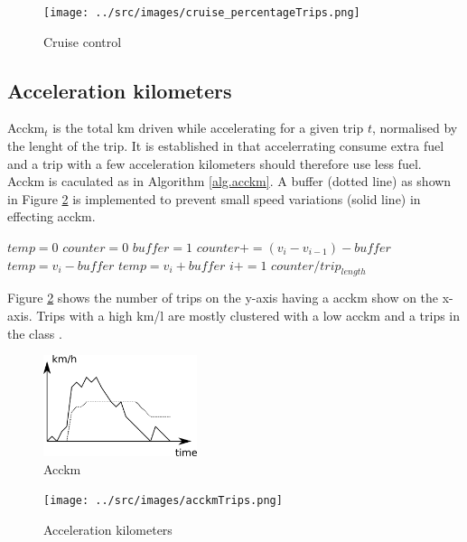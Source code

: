 \begin{figure}
\centering
\texttt{[image: ../src/images/cruise\_percentageTrips.png]}
\caption{Cruise control}
\label{fig:cruiseTrips}
\end{figure}

\subsection{Acceleration kilometers}
Acckm$_t$ is the total km driven while accelerating for a given trip $t$, normalised by the lenght of the trip. 
It is established in \cite{EcoMark} that accelerrating consume extra fuel and a trip with a few acceleration kilometers should therefore use less fuel.  
Acckm is caculated as in Algorithm \ref{alg.acckm}. 
A buffer (dotted line) as shown in Figure \ref{fig:acckm} is implemented to prevent small speed variations (solid line) in effecting acckm.

\begin{algorithm}
\caption{$acckm$}\label{alg.acckm}
\begin{algorithmic}[1]
\State $temp = 0$
\State $counter = 0$
\State $buffer = 1$ %
	\State $counter += (v_i - v_{i-1}) - buffer$
	\State $temp = v_i - buffer$
	\State $temp = v_i + buffer$
\EndIf
\State $i+=1$
\EndWhile
\State \Return $ counter / trip_{length}$

\end{algorithmic}
\end{algorithm}

Figure \ref{fig:acckm} shows the number of trips on the y-axis having a acckm show on the x-axis. 
Trips with a high km/l are mostly clustered with a low acckm and a trips in the \fuelMedium class . 

\begin{figure}[htb]
\centering
\includegraphics[width=0.4\textwidth]{../images/acckm.png}
\caption{Acckm}
\label{fig:acckm}
\end{figure}

\begin{figure}
\centering
\texttt{[image: ../src/images/acckmTrips.png]}
\caption{Acceleration kilometers}
\label{fig:acckmTrips}
\end{figure}

